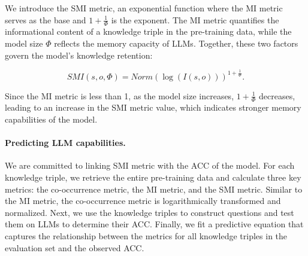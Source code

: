 We introduce the SMI metric, an exponential function where the MI metric serves as the base and $1 + \frac{1}{\Phi}$ is the exponent. The MI metric quantifies the informational content of a knowledge triple in the pre-training data, while the model size \(\Phi\) reflects the memory capacity of LLMs. Together, these two factors govern the model’s knowledge retention:

\begin{equation}
    SMI(s, o, \Phi) = Norm(\log(I(s, o)))^{1 + \frac{1}{\Phi}}.
\end{equation}

Since the MI metric is less than 1, as the model size increases, $1 + \frac{1}{\Phi}$ decreases, leading to an increase in the SMI metric value, which indicates stronger memory capabilities of the model.

\paragraph{Predicting LLM capabilities.}
We are committed to linking SMI metric with the ACC of the model. For each knowledge triple, we retrieve the entire pre-training data and calculate three key metrics: the co-occurrence metric, the MI metric, and the SMI metric. Similar to the MI metric, the co-occurrence metric is logarithmically transformed and normalized. Next, we use the knowledge triples to construct questions and test them on LLMs to determine their ACC. Finally, we fit a predictive equation that captures the relationship between the metrics for all knowledge triples in the evaluation set and the observed ACC.

